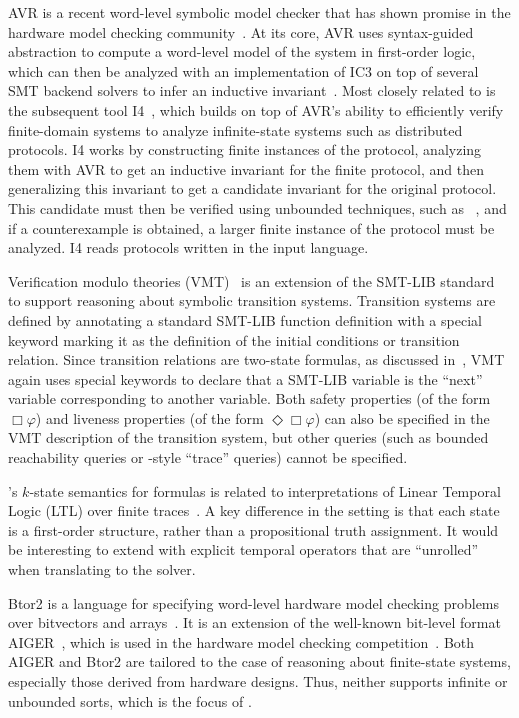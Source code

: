 AVR is a recent word-level symbolic model checker
that has shown promise in the hardware model checking community~\cite{goel-avr}.
%
At its core, AVR uses syntax-guided abstraction to compute a
word-level model of the system in first-order logic,
which can then be analyzed with an implementation of IC3 on top of several SMT backend solvers
to infer an inductive invariant~\cite{bradley-ic3}.
%
Most closely related to \mypyvy is the subsequent tool I4~\cite{i4},
which builds on top of AVR's ability to efficiently verify finite-domain systems
to analyze infinite-state systems such as distributed protocols.
%
I4 works by constructing finite instances of the protocol,
analyzing them with AVR to get an inductive invariant for the finite protocol,
and then generalizing this invariant
to get a candidate invariant for the original protocol.
%
This candidate must then be verified using unbounded techniques,
such as \ivy~\cite{Padon-al:PLDI16},
and if a counterexample is obtained,
a larger finite instance of the protocol must be analyzed.
%
I4 reads protocols written in the \ivy input language.

Verification modulo theories (VMT)~\cite{nuxmv-user-manual,vmt-website}
is an extension of the SMT-LIB standard~\cite{smtlib-standard}
to support reasoning about symbolic transition systems.
%
Transition systems are defined by annotating a standard SMT-LIB function definition
with a special keyword marking it as the definition of the
initial conditions or transition relation.
%
Since transition relations are two-state formulas,
as discussed in~,
VMT again uses special keywords to declare that a SMT-LIB variable is
the ``next'' variable corresponding to another variable.
%
Both safety properties (of the form $\Box\varphi$) and
liveness properties (of the form $\Diamond\Box\varphi$)
can also be specified in the VMT description of the transition system,
but other queries (such as bounded reachability queries or
\mypyvy-style ``trace'' queries) cannot be specified.

\mypyvy's $k$-state semantics for formulas is
related to interpretations of Linear Temporal Logic (LTL)
over finite traces~\cite{vardi-ltl-finite}.
%
A key difference in the \mypyvy setting is that
each state is a first-order structure,
rather than a propositional truth assignment.
%
It would be interesting to extend \mypyvy
with explicit temporal operators that are ``unrolled''
when translating to the solver.

Btor2 is a language for specifying word-level hardware model checking problems
over bitvectors and arrays~\cite{btor2}.
%
It is an extension of the well-known bit-level format AIGER~\cite{aiger-1.9},
which is used in the hardware model checking competition~\cite{hwmcc20}.
%
Both AIGER and Btor2 are tailored to the case of reasoning
about finite-state systems, especially those derived from hardware designs.
%
Thus, neither supports infinite or unbounded sorts,
which is the focus of \mypyvy.

